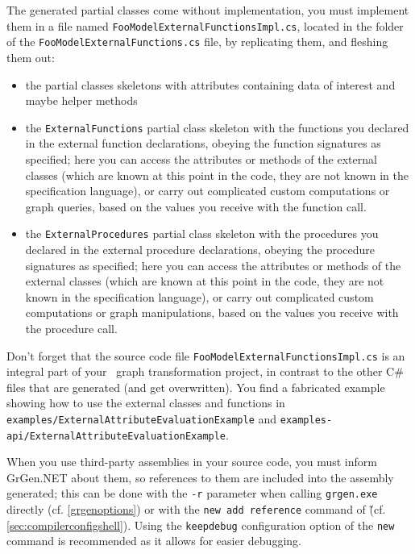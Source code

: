 \noindent The generated partial classes come without implementation, you must implement them in a file named \texttt{Foo\-Model\-External\-Functions\-Impl.cs}, located in the folder of the \texttt{Foo\-Model\-External\-Functions.cs} file, by replicating them, and fleshing them out:
\begin{itemize}
	\item the partial classes skeletons with attributes containing data of interest and maybe helper methods
	\item the \texttt{ExternalFunctions} partial class skeleton with the functions you declared in the external function declarations, obeying the function signatures as specified;
here you can access the attributes or methods of the external classes (which are known at this point in the code, they are not known in the specification language), or carry out complicated custom computations or graph queries, based on the values you receive with the function call.
	\item the \texttt{ExternalProcedures} partial class skeleton with the procedures you declared in the external procedure declarations, obeying the procedure signatures as specified;
here you can access the attributes or methods of the external classes (which are known at this point in the code, they are not known in the specification language), or carry out complicated custom computations or graph manipulations, based on the values you receive with the procedure call.
\end{itemize}

\noindent Don't forget that the source code file \texttt{Foo\-Model\-External\-Functions\-Impl.cs} is an integral part of your \GrG~graph transformation project, in contrast to the other C\# files that are generated (and get overwritten).
You find a fabricated example showing how to use the external classes and functions in \texttt{examples/External\-Attribute\-Evaluation\-Example} and \texttt{examples-api/External\-Attribute\-Evaluation\-Example}.

When you use third-party assemblies in your source code, you must inform GrGen.NET about them, so references to them are included into the assembly generated; this can be done with the \texttt{-r} parameter when calling \texttt{grgen.exe} directly (cf. \ref{grgenoptions}) or with the \texttt{new add reference} command of \GrShell\~(cf. \ref{sec:compilerconfigshell}). 
Using the \texttt{keepdebug} configuration option of the \texttt{new} command is recommended as it allows for easier debugging.

